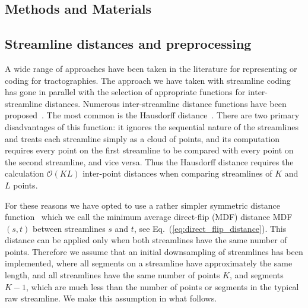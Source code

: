 \documentclass{bioinfo}
\begin{document}
\begin{methods}

\section{Methods and Materials}

\subsection{\label{sub:track-distances}Streamline distances and preprocessing}

A wide range of approaches have been taken in the literature for
representing or coding for tractographies. The approach we have taken
with streamline coding has gone in parallel with the selection of
appropriate functions for inter-streamline distances.  Numerous
inter-streamline distance functions have been proposed~\citep{Ding2003,
  MaddahIPMI2007, zhang2005dti}. The most common is the Hausdorff
distance~\citep[and many other studies]{corouge2004towards}. There are
two primary disadvantages of this function: it ignores the sequential
nature of the streamlines and treats each streamline simply as a cloud
of points, and its computation requires every point on the first streamline
to be compared with every point on the second streamline, and vice
versa. Thus the Hausdorff distance requires the calculation
$\mathcal{O}(KL)$ inter-point distances when comparing streamlines of
$K$ and $L$ points.

For these reasons we have opted to use a rather simpler symmetric
distance function~\citep{EGMB10, Visser2010} which we call the minimum
average direct-flip (MDF) distance MDF$(s,t)$ between streamlines $s$
and $t$, see Eq.~(\ref{eq:direct_flip_distance}). This distance can be
applied only when both streamlines have the same number of
points. Therefore we assume that an initial downsampling of streamlines
has been implemented, where all segments on a streamline have
approximately the same length, and all streamlines have the same number
of points $K$, and segments $K-1$, which are much less than the number
of points or segments in the typical raw streamline. We make this
assumption in what follows.


\end{methods}
\end{document}
